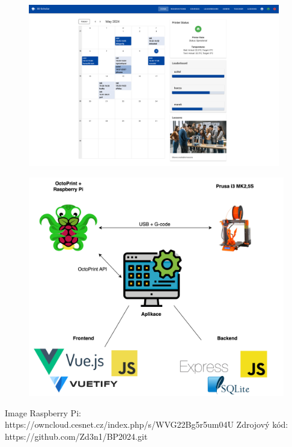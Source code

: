 \documentclass[twoside, 12pt]{article}
\begin{document}
\label{UvodniObrazovka}
\begin{figure}[htbp]
\centering
\includegraphics[angle=270, width=11cm]{obrazky/Final.png}

\end{figure}


\label{Diagram základních použitých technologií}
\begin{figure}[htbp]
\centering
\includegraphics[angle=90, width=14cm]{obrazky/DiagramV6.png}
\end{figure}


Image Raspberry Pi: https://owncloud.cesnet.cz/index.php/s/WVG22Bg5r5um04U
Zdrojový kód: https://github.com/Zd3n1/BP2024.git
\end{document}

